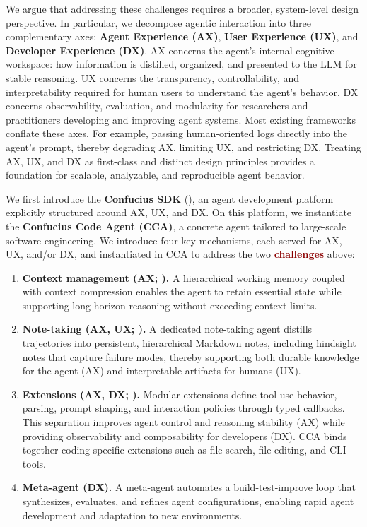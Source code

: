 We argue that addressing these challenges requires a broader, system-level design perspective. In particular, we decompose agentic interaction into three complementary axes: \textbf{Agent Experience (AX)}, \textbf{User Experience (UX)}, and \textbf{Developer Experience (DX)}.  
AX concerns the agent’s internal cognitive workspace: how information is distilled, organized, and presented to the LLM for stable reasoning.  
UX concerns the transparency, controllability, and interpretability required for human users to understand the agent’s behavior.  
DX concerns observability, evaluation, and modularity for researchers and practitioners developing and improving agent systems.  
Most existing frameworks conflate these axes. For example, passing human-oriented logs directly into the agent’s prompt, thereby degrading AX, limiting UX, and restricting DX. Treating AX, UX, and DX as first-class and distinct design principles provides a foundation for scalable, analyzable, and reproducible agent behavior.

We first introduce the \textbf{Confucius SDK} (), an agent development platform explicitly structured around AX, UX, and DX. 
On this platform, we instantiate the \textbf{Confucius Code Agent (CCA)}, a concrete agent tailored to large-scale software engineering. 
We introduce four key mechanisms, each served for AX, UX, and/or DX, and instantiated in CCA to address the two \textcolor{darkred}{\textbf{challenges}} above:
\begin{enumerate}[leftmargin=*]
    \item \textbf{Context management (AX; \COne).}  
    A hierarchical working memory coupled with context compression enables the agent to retain essential state while supporting long-horizon reasoning without exceeding context limits.

    \item \textbf{Note-taking (AX, UX; \CTwo).}  
    A dedicated note-taking agent distills trajectories into persistent, hierarchical Markdown notes, including hindsight notes that capture failure modes, thereby supporting both durable knowledge for the agent (AX) and interpretable artifacts for humans (UX).

    \item \textbf{Extensions (AX, DX; \COne).}  
    Modular extensions define tool-use behavior, parsing, prompt shaping, and interaction policies through typed callbacks. This separation improves agent control and reasoning stability (AX) while providing observability and composability for developers (DX). CCA binds together coding-specific extensions such as file search, file editing, and CLI tools. 

    \item \textbf{Meta-agent (DX).}  
    A meta-agent automates a build-test-improve loop that synthesizes, evaluates, and refines agent configurations, enabling rapid agent development and adaptation to new environments.
\end{enumerate}

